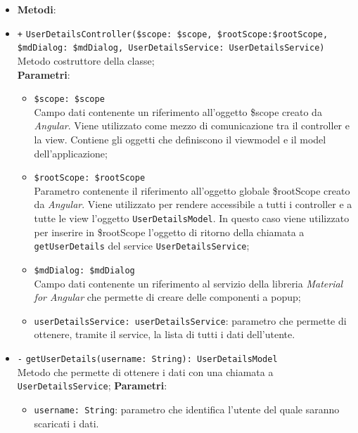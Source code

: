 \begin{itemize}
\begin{itemize}
	\end{itemize}	
	\begin{itemize}
		\item \textbf{Metodi}:
		\item \texttt{+} \texttt{UserDetailsController(\$scope: \$scope, \$rootScope:\$rootScope, \$mdDialog: \$mdDialog, UserDetailsService: UserDetailsService)} \\ Metodo costruttore della classe;\\
		\textbf{Parametri}: 
		\begin{itemize}
			\item \texttt{\$scope: \$scope} \\
			Campo dati contenente un riferimento all’oggetto \$scope creato da \textit{Angular}. Viene utilizzato come mezzo di comunicazione tra il controller e la view. Contiene gli oggetti che definiscono il viewmodel e il model dell’applicazione;
			\item \texttt{\$rootScope: \$rootScope} \\
			Parametro contenente il riferimento all'oggetto globale \$rootScope creato da \textit{Angular}. Viene utilizzato per rendere accessibile a tutti i controller e a tutte le view l'oggetto \texttt{UserDetailsModel}. In questo caso viene utilizzato per inserire in \$rootScope l'oggetto di ritorno della chiamata a \texttt{getUserDetails} del service \texttt{UserDetailsService};
			\item \texttt{\$mdDialog: \$mdDialog} \\
			Campo dati contenente un riferimento al servizio della libreria \textit{Material for Angular} che permette di creare delle componenti a popup;
			\item \texttt{userDetailsService: userDetailsService}: parametro che permette di ottenere, tramite il service, la lista di tutti i dati dell'utente.
		\end{itemize}
		\item \texttt{-} \texttt{getUserDetails(username: String): UserDetailsModel} \\ Metodo che permette di ottenere i dati con una chiamata a \texttt{UserDetailsService};
		\textbf{Parametri}:
		\begin{itemize}
			\item \texttt{username: String}: parametro che identifica l'utente del quale saranno scaricati i dati.
		\end{itemize}
	\end{itemize}
\end{itemize}

